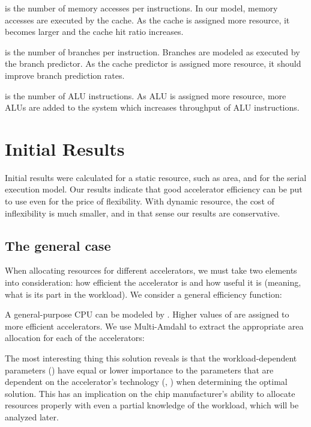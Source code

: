 \documentclass[twocolumn,english]{IEEEtran}
\begin{document}
 is the number of memory accesses per instructions.
In our model, memory accesses are executed by the cache. As the cache
is assigned more resource, it becomes larger and the cache hit ratio
increases.




 is the number of branches per instruction. Branches
are modeled as executed by the branch predictor. As the cache predictor
is assigned more resource, it should improve branch prediction rates.




 is the number of ALU instructions. As ALU is assigned
more resource, more ALUs are added to the system which increases throughput
of ALU instructions. 





\section{Initial Results}

Initial results were calculated for a static resource, such as area,
and for the serial execution model. Our results indicate that good
accelerator efficiency can be put to use even for the price of flexibility.
With dynamic resource, the cost of inflexibility is much smaller,
and in that sense our results are conservative.


\subsection{The general case}

When allocating resources for different accelerators, we must take
two elements into consideration: how efficient the accelerator is
and how useful it is (meaning, what is its part in the workload).
We consider a general efficiency function:


A general-purpose CPU can be modeled by . Higher values
of  are assigned to more efficient accelerators. We use Multi-Amdahl
to extract the appropriate area allocation for each of the accelerators:


The most interesting thing this solution reveals is that the workload-dependent
parameters () have equal or lower importance to the parameters
that are dependent on the accelerator's technology (,
) when determining the optimal solution. This has an implication
on the chip manufacturer's ability to allocate resources properly
with even a partial knowledge of the workload, which will be analyzed
later.
\end{document}
